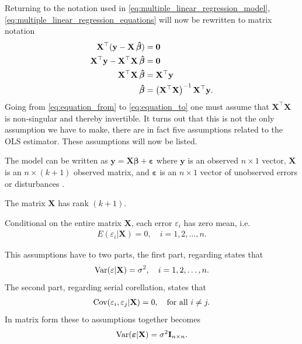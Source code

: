 Returning to the notation used in \eqref{eq:multiple_linear_regression_model}, \eqref{eq:multiple_linear_regression_equations} will now be rewritten to matrix notation
\begin{align}
    \mathbf{X}^\top(\mathbf{y} - \mathbf{X}\operatorname{\boldsymbol{\hat{\beta}}}) &= \mathbf{0} \nonumber\\
    \mathbf{X}^\top\mathbf{y} - \mathbf{X}^\top\mathbf{X}\operatorname{\boldsymbol{\hat{\beta}}} &= \mathbf{0}\nonumber\\
    \mathbf{X}^\top\mathbf{X}\operatorname{\boldsymbol{\hat{\beta}}} &= \mathbf{X}^\top\mathbf{y}\label{eq:equation_from} \\
    \operatorname{\boldsymbol{\hat{\beta}}} &= \left(\mathbf{X}^\top\mathbf{X}\right)^{-1}\mathbf{X}^\top\mathbf{y}.\label{eq:equation_to}
\end{align}
Going from \eqref{eq:equation_from} to \eqref{eq:equation_to} one must assume that $\mathbf{X}^\top\mathbf{X}$ is non-singular and thereby invertible.
It turns out that this is not the only assumption we have to make, there are in fact five assumptions related to the OLS estimator.
These assumptions will now be listed.
\begin{assumption}
    The model can be written as $\mathbf{y} = \mathbf{X}\boldsymbol{\beta} + \boldsymbol{\varepsilon}$ where $\mathbf{y}$ is an observed $n \times 1$ vector, $\mathbf{X}$ is an $n \times (k + 1)$ observed matrix, and $\boldsymbol{\varepsilon}$ is an $n \times 1$ vector of unobserved errors or disturbances \cite[p. 1]{Wooldridge2012}.
\end{assumption}
\begin{assumption}
    The matrix $\mathbf{X}$ has rank $(k + 1)$.
\end{assumption}
\begin{assumption}
    Conditional on the entire matrix $\mathbf{X}$, each error $\varepsilon_i$ has zero mean, i.e.
    \begin{align*}
        E(\varepsilon_i | \mathbf{X}) = 0, \quad i = 1, 2, \ldots, n.
    \end{align*}
\end{assumption}
\begin{assumption}
    This assumptions have to two parts, the first part, regarding \homo states that
    \begin{align*}
        \operatorname{\text{Var}}(\varepsilon | \mathbf{X}) = \sigma^2, \quad i = 1,2, \ldots, n.
    \end{align*}
    The second part, regarding serial corellation, states that
    \begin{align*}
        \operatorname{\text{Cov}}(\varepsilon_i, \varepsilon_j | \mathbf{X}) = 0, \quad \text{for all} \ i \neq j.
    \end{align*}
    In matrix form these to assumptions together becomes
    \begin{align*}
        \operatorname{\text{Var}}(\boldsymbol{\varepsilon} | \mathbf{X}) = \sigma^2\mathbf{I}_{n\times n}.
    \end{align*}
\end{assumption}
